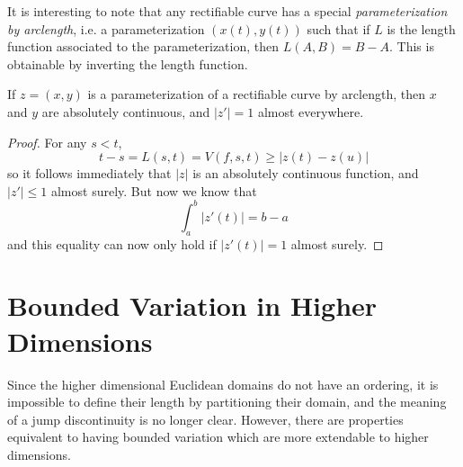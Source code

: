 It is interesting to note that any rectifiable curve has a special {\it parameterization by arclength}, i.e. a parameterization $(x(t), y(t))$ such that if $L$ is the length function associated to the parameterization, then $L(A,B) = B - A$. This is obtainable by inverting the length function.

\begin{theorem}
  If $z = (x,y)$ is a parameterization of a rectifiable curve by arclength, then $x$ and $y$ are absolutely continuous, and $|z'| = 1$ almost everywhere.
\end{theorem}
\begin{proof}
  For any $s < t$,
  \[ t - s = L(s,t) = V(f,s,t) \geq |z(t) - z(u)| \]
  so it follows immediately that $|z|$ is an absolutely continuous function, and $|z'| \leq 1$ almost surely. But now we know that
  \[ \int_a^b |z'(t)| = b - a \]
  and this equality can now only hold if $|z'(t)| = 1$ almost surely.
\end{proof}

\section{Bounded Variation in Higher Dimensions}

Since the higher dimensional Euclidean domains do not have an ordering, it is impossible to define their length by partitioning their domain, and the meaning of a jump discontinuity is no longer clear. However, there are properties equivalent to having bounded variation which are more extendable to higher dimensions.

